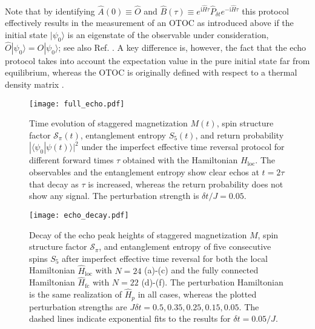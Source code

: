 \documentclass[%
 reprint,
unsortedaddress,
 amsmath,amssymb,
 prl,
]{revtex4-1}
\newcommand{\im}{\mathrm{i}}
\begin{document}
Note that by identifying $\hat A(0)\equiv \hat O$ and
$\hat B(\tau)\equiv e^{\im\hat H\tau}\hat P_{\delta t}e^{-\im\hat H\tau}$ 
this protocol effectively results in the measurement of an OTOC as introduced above 
if the initial state $|\psi_0\rangle$ 
is an eigenstate of the observable under consideration, 
$\hat O|\psi_0\rangle=O|\psi_0\rangle$; see also Ref. \cite{Garttner2017}.
A key difference is, however, the fact that the echo protocol takes into account the expectation value
in the pure initial state far from equilibrium, whereas the OTOC is originally defined with respect to a thermal
density matrix \cite{Shenker2014,Kitaev2014}.

\begin{figure}[t]
\texttt{[image: full\_echo.pdf]}
\caption{Time evolution of staggered magnetization $M(t)$, spin structure factor $\mathcal S_\pi(t)$, entanglement entropy $S_5(t)$, and return probability $|\langle\psi_0|\psi(t)\rangle|^2$ under the
imperfect effective time reversal protocol for different forward times $\tau$ obtained with the
Hamiltonian $H_\text{loc}$. The observables and the entanglement entropy show clear
echos at $t=2\tau$ that decay as $\tau$ is increased, whereas the return probability does not 
show any signal. The perturbation strength is $\delta t/J=0.05$.}
\label{fig:full_echo}
\end{figure}
\begin{figure*}[t]
\texttt{[image: echo\_decay.pdf]}
\caption{Decay of the echo peak heights of staggered magnetization $M$, spin structure factor 
$\mathcal S_\pi$, and entanglement entropy of five consecutive spins $S_5$ 
after imperfect effective time reversal for both the local Hamiltonian $\hat H_\text{loc}$ with $N=24$ (a)-(c)
and the fully connected Hamiltonian $\hat H_\text{fc}$ with $N=22$ (d)-(f). The perturbation Hamiltonian is the same realization
of $\hat H_p$ in all cases, whereas the plotted perturbation strengths are 
$J\delta t=0.5,0.35,0.25,0.15,0.05$. The dashed lines indicate exponential fits to the results for $\delta t=0.05/J$.}
\label{fig:echo_decay}
\end{figure*}
\end{document}
